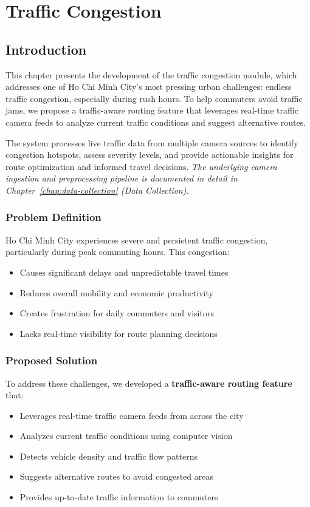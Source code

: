 \chapter{Traffic Congestion}
\label{chap:traffic-congestion}

\section{Introduction}

This chapter presents the development of the traffic congestion module, which addresses one of Ho Chi Minh City's most pressing urban challenges: endless traffic congestion, especially during rush hours. To help commuters avoid traffic jams, we propose a traffic-aware routing feature that leverages real-time traffic camera feeds to analyze current traffic conditions and suggest alternative routes.

The system processes live traffic data from multiple camera sources to identify congestion hotspots, assess severity levels, and provide actionable insights for route optimization and informed travel decisions.
\newline\textit{The underlying camera ingestion and preprocessing pipeline is documented in detail in Chapter~\ref{chap:data-collection} (Data Collection).}

\subsection{Problem Definition}

Ho Chi Minh City experiences severe and persistent traffic congestion, particularly during peak commuting hours. This congestion:
\begin{itemize}
    \item Causes significant delays and unpredictable travel times
    \item Reduces overall mobility and economic productivity
    \item Creates frustration for daily commuters and visitors
    \item Lacks real-time visibility for route planning decisions
\end{itemize}

\subsection{Proposed Solution}

To address these challenges, we developed a \textbf{traffic-aware routing feature} that:
\begin{itemize}
    \item Leverages real-time traffic camera feeds from across the city
    \item Analyzes current traffic conditions using computer vision
    \item Detects vehicle density and traffic flow patterns
    \item Suggests alternative routes to avoid congested areas
    \item Provides up-to-date traffic information to commuters
\end{itemize}

